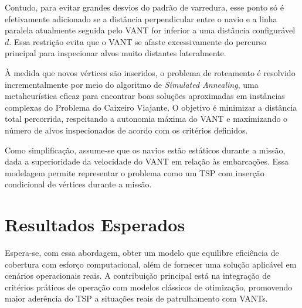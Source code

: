 \documentclass[12 pt]{article}
\begin{document}
Contudo, para evitar grandes desvios do padrão de varredura, esse ponto só é efetivamente adicionado se a distância perpendicular entre o navio e a linha paralela atualmente seguida pelo VANT for inferior a uma distância configurável \(d\). Essa restrição evita que o VANT se afaste excessivamente do percurso principal para inspecionar alvos muito distantes lateralmente.

À medida que novos vértices são inseridos, o problema de roteamento é resolvido incrementalmente por meio do algoritmo de \textit{Simulated Annealing}, uma metaheurística eficaz para encontrar boas soluções aproximadas em instâncias complexas do Problema do Caixeiro Viajante. O objetivo é minimizar a distância total percorrida, respeitando a autonomia máxima do VANT e maximizando o número de alvos inspecionados de acordo com os critérios definidos.

Como simplificação, assume-se que os navios estão estáticos durante a missão, dada a superioridade da velocidade do VANT em relação às embarcações. Essa modelagem permite representar o problema como um TSP com inserção condicional de vértices durante a missão.

\section{Resultados Esperados}
Espera-se, com essa abordagem, obter um modelo que equilibre eficiência de cobertura com esforço computacional, além de fornecer uma solução aplicável em cenários operacionais reais. A contribuição principal está na integração de critérios práticos de operação com modelos clássicos de otimização, promovendo maior aderência do TSP a situações reais de patrulhamento com VANTs.




\end{document}
